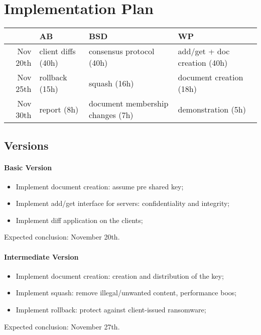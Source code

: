 \section{Implementation Plan}

\begin{table*}[ht]
    \centering
    \label{Effort Commitment}
    \begin{tabular}{r|l|l|l}
                 & AB                  & BSD                               & WP \\
        \hline
        Nov 20th & client diffs (40h)  & consensus protocol (40h)          & add/get + doc creation (40h) \\
        Nov 25th & rollback (15h)      & squash (16h)                      & document creation (18h) \\
        Nov 30th & report (8h)         & document membership changes (7h)  & demonstration (5h) \\
    \end{tabular}
\end{table*}

\subsection{Versions}

\paragraph{Basic Version} {
    \begin{itemize}
        \setlength{\itemsep}{0pt}
        \setlength{\parskip}{0pt}
        \setlength{\parsep}{0pt}
        \item Implement document creation: assume pre shared key;
        \item Implement add/get interface for servers: confidentiality and integrity;
        \item Implement diff application on the clients;
    \end{itemize}
    Expected conclusion: November 20th.
}

\paragraph{Intermediate Version} {
    \begin{itemize}
        \setlength{\itemsep}{0pt}
        \setlength{\parskip}{0pt}
        \setlength{\parsep}{0pt}
        \item Implement document creation: creation and distribution of the key;
        \item Implement squash: remove illegal/unwanted content, performance boos;
        \item Implement rollback: protect against client-issued ransomware;
    \end{itemize}
    Expected conclusion: November 27th.
}

